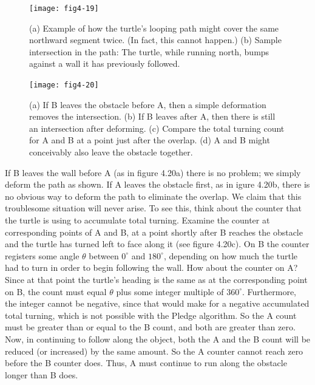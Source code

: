 \documentclass{book}
\begin{document}
\begin{figure}
\begin{center}
\texttt{[image: fig4-19]}
\caption{(a) Example of how the turtle's looping path might cover the same northward segment twice. (In fact, this cannot happen.) (b) Sample intersection in the path: The turtle, while running north, bumps against a wall it has previously followed.}
\end{center}
\end{figure}

\begin{figure}
\begin{center}
\texttt{[image: fig4-20]}
\caption{(a) If B leaves the obstacle before A, then a simple deformation removes the intersection. (b) If B leaves after A, then there is still an intersection after deforming. (c) Compare the total turning count for A and B at a point just after the overlap. (d) A and B might conceivably also leave the obstacle together.}
\end{center}
\end{figure}

If B leaves the wall before A (as in figure 4.20a) there is no problem;
we simply deform the path as shown. If A leaves the obstacle first, as in
igure 4.20b, there is no obvious way to deform the path to eliminate the
overlap. We claim that this troublesome situation will never arise. To
see this, think about the counter that the turtle is using to accumulate
total turning. Examine the counter at corresponding points of A and
B, at a point shortly after B reaches the obstacle and the turtle has
turned left to face along it (see figure 4.20c). On B the counter registers
some angle $\theta$ between $0^{\circ}$ and $180^{\circ}$, depending on how much the turtle
had to turn in order to begin following the wall. How about the counter
on A? Since at that point the turtle's heading is the same as at the
corresponding point on B, the count must equal $\theta$ plus some integer
multiple of $360^{\circ}$. Furthermore, the integer cannot be negative, since
that would make for a negative accumulated total turning, which is not
possible with the Pledge algorithm. So the A count must be greater
than or equal to the B count, and both are greater than zero. Now, in
continuing to follow along the object, both the A and the B count will
be reduced (or increased) by the same amount. So the A counter cannot
reach zero before the B counter does. Thus, A must continue to run
along the obstacle longer than B does.
\end{document}
